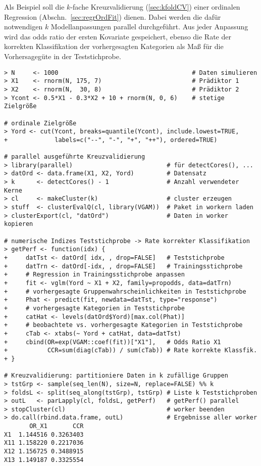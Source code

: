 Als Beispiel soll die $k$-fache Kreuzvalidierung (\ref{sec:kfoldCV}) einer ordinalen Regression (Abschn.\ \ref{sec:regrOrdFit}) dienen. Dabei werden die dafür notwendigen $k$ Modellanpassungen parallel durchgeführt. Aus jeder Anpassung wird das odds ratio der ersten Kovariate gespeichert, ebenso die Rate der korrekten Klassifikation der vorhergesagten Kategorien als Maß für die Vorhersagegüte in der Teststichprobe.
\begin{lstlisting}
> N     <- 1000                                     # Daten simulieren
> X1    <- rnorm(N, 175, 7)                         # Prädiktor 1
> X2    <- rnorm(N,  30, 8)                         # Prädiktor 2
> Ycont <- 0.5*X1 - 0.3*X2 + 10 + rnorm(N, 0, 6)    # stetige Zielgröße

# ordinale Zielgröße
> Yord <- cut(Ycont, breaks=quantile(Ycont), include.lowest=TRUE,
+             labels=c("--", "-", "+", "++"), ordered=TRUE)

# parallel ausgeführte Kreuzvalidierung
> library(parallel)                          # für detectCores(), ...
> datOrd <- data.frame(X1, X2, Yord)         # Datensatz
> k      <- detectCores() - 1                # Anzahl verwendeter Kerne
> cl     <- makeCluster(k)                   # cluster erzeugen
> stuff  <- clusterEvalQ(cl, library(VGAM))  # Paket in workern laden
> clusterExport(cl, "datOrd")                # Daten in worker kopieren

# numerische Indizes Teststichprobe -> Rate korrekter Klassifikation
> getPerf <- function(idx) {
+     datTst <- datOrd[ idx, , drop=FALSE]   # Teststichprobe
+     datTrn <- datOrd[-idx, , drop=FALSE]   # Trainingsstichprobe
+     # Regression in Trainingsstichprobe anpassen
+     fit <- vglm(Yord ~ X1 + X2, family=propodds, data=datTrn)
+     # vorhergesagte Gruppenwahrscheinlichkeiten in Teststichprobe
+     Phat <- predict(fit, newdata=datTst, type="response")
+     # vorhergesagte Kategorien in Teststichprobe
+     catHat <- levels(datOrd$Yord)[max.col(Phat)]
+     # beobachtete vs. vorhergesagte Kategorien in Teststichprobe
+     cTab <- xtabs(~ Yord + catHat, data=datTst)
+     cbind(OR=exp(VGAM::coef(fit))["X1"],   # Odds Ratio X1
+           CCR=sum(diag(cTab)) / sum(cTab)) # Rate korrekte Klassfik.
+ }

# Kreuzvalidierung: partitioniere Daten in k zufällige Gruppen
> tstGrp <- sample(seq_len(N), size=N, replace=FALSE) %% k
> foldsL <- split(seq_along(tstGrp), tstGrp) # Liste k Teststichproben
> outL   <- parLapply(cl, foldsL, getPerf)   # getPerf() parallel
> stopCluster(cl)                            # worker beenden
> do.call(rbind.data.frame, outL)            # Ergebnisse aller worker
       OR_X1       CCR
X1  1.144516 0.3263403
X11 1.158220 0.2217036
X12 1.156725 0.3488915
X13 1.149187 0.3325554
\end{lstlisting}

